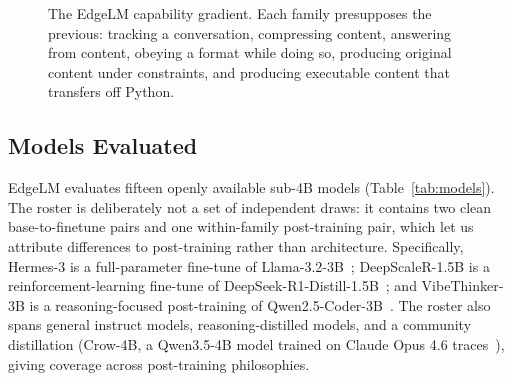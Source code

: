 \documentclass[runningheads]{llncs}
\begin{document}
\begin{figure}[t]
\centering
{}
\caption{The EdgeLM capability gradient. Each family presupposes the previous:
tracking a conversation, compressing content, answering from content, obeying a
format while doing so, producing original content under constraints, and
producing executable content that transfers off Python.}
\label{fig:gradient}
\end{figure}

\subsection{Models Evaluated}
\label{sec:models}

EdgeLM evaluates fifteen openly available sub-4B models
(Table~\ref{tab:models}). The roster is deliberately not a set of independent
draws: it contains two clean base-to-finetune pairs and one within-family
post-training pair, which let us attribute differences to post-training rather
than architecture. Specifically, Hermes-3 is a full-parameter fine-tune of
Llama-3.2-3B~\cite{hermes3,llama3}; DeepScaleR-1.5B is a reinforcement-learning
fine-tune of DeepSeek-R1-Distill-1.5B~\cite{deepscaler2025,deepseekr1}; and
VibeThinker-3B is a reasoning-focused post-training of
Qwen2.5-Coder-3B~\cite{vibethinker2026,qwen25}. The roster also spans general
instruct models, reasoning-distilled models, and a community distillation
(Crow-4B, a Qwen3.5-4B model trained on Claude Opus 4.6
traces~\cite{crow4b}), giving coverage across post-training philosophies.
\end{document}
